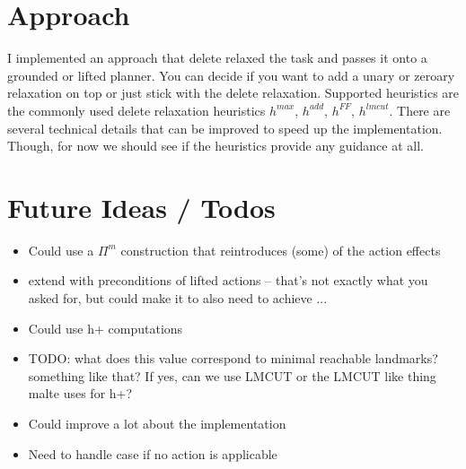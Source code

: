 \documentclass[twocolumn]{article}
\newcommand{\task}{\ensuremath{\Pi}\xspace}
\begin{document}
	\section{Approach}
	
	I implemented an approach that delete relaxed the task and passes it onto a grounded or lifted planner.
	You can decide if you want to add a unary or zeroary relaxation on top or just stick with the delete relaxation.
	Supported heuristics are the commonly used delete relaxation heuristics $h^{max}$, $h^{add}$, $h^{FF}$, $h^{lmcut}$.
	There are several technical details that can be improved to speed up the implementation.
	Though, for now we should see if the heuristics provide any guidance at all.
		
	\section{Future Ideas / Todos}
	
	\begin{itemize}
		\item Could use a $\task^{m}$ construction that reintroduces (some) of the action effects
		\item extend with preconditions of lifted actions -- that's not exactly what you asked for, but could make it to also need to achieve ... 
		\item Could use h+ computations
		\item 
		TODO: what does this value correspond to minimal reachable landmarks? something like that? If yes, can we use LMCUT or the LMCUT like thing malte uses for h+?
		\item Could improve a lot about the implementation
		\item Need to handle case if no action is applicable
	\end{itemize}
	
	
\end{document}
